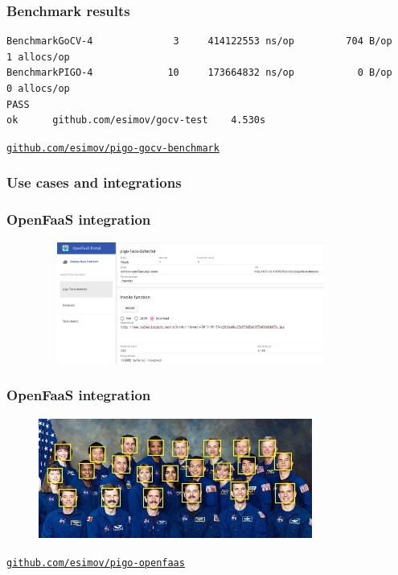 \documentclass[9pt]{beamer}
\newcommand{\myblue} [1] {{\color{blue}#1}}
\begin{document}
\begin{frame}[fragile]
\frametitle{Benchmark results}



\begin{verbatim}
BenchmarkGoCV-4              3     414122553 ns/op         704 B/op           1 allocs/op
BenchmarkPIGO-4             10     173664832 ns/op           0 B/op           0 allocs/op
PASS
ok      github.com/esimov/gocv-test    4.530s

\end{verbatim}


\myblue{\href{https://github.com/esimov/pigo-gocv-benchmark}{\texttt{github.com/esimov/pigo-gocv-benchmark}}}


\end{frame}

\begin{frame}[fragile]
\frametitle{Use cases and integrations}


\end{frame}

\begin{frame}[fragile]
\frametitle{OpenFaaS integration}


\begin{figure}[h]
\begin{center}
\includegraphics[width=10cm,height=4cm]{assets/pigo_openfaas.png}
\end{center}

\end{figure}


\end{frame}

\begin{frame}[fragile]
\frametitle{OpenFaaS integration}


\begin{figure}[h]
\begin{center}
\includegraphics[width=9cm,height=4cm]{assets/pigo_openfaas_result.jpg}
\end{center}

\end{figure}

\myblue{\href{https://github.com/esimov/pigo-openfaas}{\texttt{github.com/esimov/pigo-openfaas}}}


\end{frame}
\end{document}
